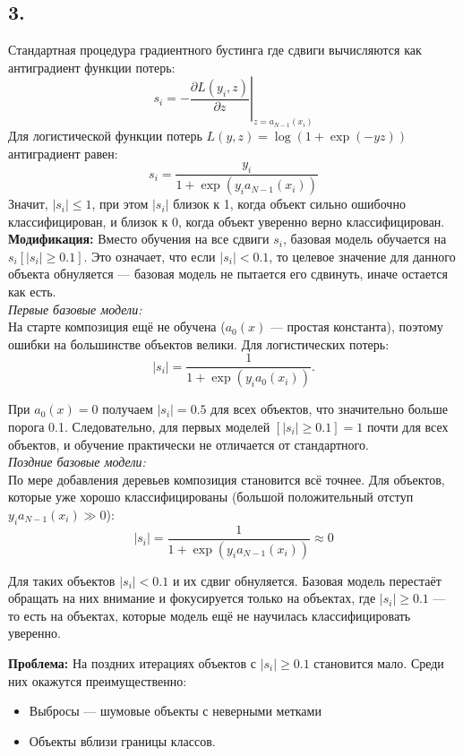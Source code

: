 \documentclass[12pt,a4paper]{article}
\begin{document}
\subsection*{3.}

Стандартная процедура градиентного бустинга где сдвиги вычисляются как антиградиент функции потерь:
\[
s_i = -\left.\frac{\partial L(y_i, z)}{\partial z}\right|_{z=a_{N-1}(x_i)}
\]
Для логистической функции потерь $L(y,z) = \log(1 + \exp(-yz))$ антиградиент равен:
\[
s_i = \frac{y_i}{1 + \exp(y_i a_{N-1}(x_i))}
\]
Значит, $|s_i| \leqslant 1$, при этом $|s_i|$ близок к 1, когда объект сильно ошибочно классифицирован, и близок к 0, когда объект уверенно верно классифицирован.\\[1mm]
\textbf{Модификация:} Вместо обучения на все сдвиги $s_i$, базовая модель обучается на $s_i [|s_i| \geqslant 0.1]$. Это означает, что если $|s_i| < 0.1$, то целевое значение для данного объекта обнуляется --- базовая модель не пытается его сдвинуть, иначе остается как есть.\\[1mm]

\textit{Первые базовые модели:}\\[1mm]
На старте композиция ещё не обучена ($a_0(x)$ --- простая константа), поэтому ошибки на большинстве объектов велики. Для логистических потерь:
\[
|s_i| = \frac{1}{1 + \exp(y_i a_0(x_i))}.
\]

При $a_0(x) = 0$ получаем $|s_i| = 0.5$ для всех объектов, что значительно больше порога 0.1. Следовательно, для первых моделей $[|s_i| \geqslant 0.1] = 1$ почти для всех объектов, и обучение практически не отличается от стандартного.\\

\textit{Поздние базовые модели:}\\[1mm]
По мере добавления деревьев композиция становится всё точнее. Для объектов, которые уже хорошо классифицированы (большой положительный отступ $y_i a_{N-1}(x_i) \gg 0$):
\[
|s_i| = \frac{1}{1 + \exp(y_i a_{N-1}(x_i))} \approx 0
\]

Для таких объектов $|s_i| < 0.1$ и их сдвиг обнуляется. Базовая модель перестаёт обращать на них внимание и фокусируется только на объектах, где $|s_i| \geqslant 0.1$ --- то есть на объектах, которые модель ещё не научилась классифицировать уверенно.

\textbf{Проблема:} На поздних итерациях объектов с $|s_i| \geqslant 0.1$ становится мало. Среди них окажутся преимущественно:
\begin{itemize}
\item Выбросы --- шумовые объекты с неверными метками
\item Объекты вблизи границы классов.
\end{itemize}
\end{document}
